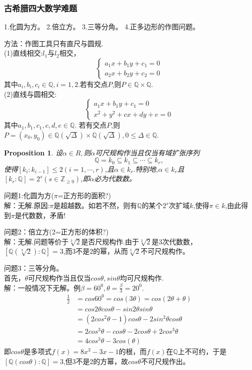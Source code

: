 \documentclass[UTF8]{article}
\newtheorem{prop}{Proposition}[section]
\begin{document}
\subsubsection{古希腊四大数学难题}

1.化圆为方。
2.倍立方。
3.三等分角。
4.正多边形的作图问题。


方法：作图工具只有直尺与圆规.\\
(1)直线相交:$l_{1}$与$l_{2}$相交，
\begin{displaymath}
\left\{ 
\begin{array}{ll}
a_{1}x+b_{1}y+c_{1}=0\\
a_{2}x+b_{2}y+c_{2}=0
\end{array}
\right.
\end{displaymath}
其中$a_{i},b_{i},c_{i}\in \mathbb{Q},i=1,2$.若有交点$P$,则$P\in \mathbb{Q}\times\mathbb{Q}.$\\
(2)直线与圆相交:
\begin{displaymath}
\left\{ 
\begin{array}{ll}
a_{1}x+b_{1}y+c_{1}=0\\
x^{2}+y^{2}+cx+dy+e=0
\end{array}
\right.
\end{displaymath}
其中$a_{1},b_{1},c_{1},c,d,e\in \mathbb{Q}.$
若有交点$P$,则$P=(x_{0},y_{0})\in \mathbb{Q}(\sqrt{\Delta})\times\mathbb{Q}(\sqrt{\Delta}) ,0\leq \Delta\in \mathbb{Q}$.\\
\begin{prop}
设$\alpha\in R,$则$\alpha$可尺规构作当且仅当有域扩张序列
$$\mathbb{Q}=k_{0}\subseteq k_{1}\subseteq \cdots\subseteq k_{r},
$$
使得$[k_{i}:k_{i-1}]\leq 2(i=1,\cdots,r)$,且$\alpha\in k_{r}.$特别地,$\alpha\in k_{r}$且$[k_{r}:\mathbb{Q}]=2^{s}(s\in \mathbb{Z}_{\geq 0})$,即$\alpha$必为代数数。
\end{prop}

问题1:化圆为方($\pi$=正方形的面积?)\\
解：无解.原因:$\pi$是超越数。如若不然，则有$\mathbb{Q}$的某个$2^{s}$次扩域$k$,使得$\pi\in k$,由此得到$\pi$是代数数，矛盾!


问题2：倍立方(2=正方形的体积?)\\
解：无解.问题等价于$\sqrt[3]{2}$是否尺规构作.由于$\sqrt[3]{2}$是3次代数数，$[\mathbb{Q}(\sqrt[3]{2}):\mathbb{Q}]=3$,而$3$不是$2$的幂，从而$\sqrt[3]{2}$不可尺规构作。


问题3：三等分角。\\
首先，$\theta$可尺规构作当且仅当$cos\theta,sin\theta$均可尺规构作.\\
解：一般情况下无解。例$\beta=60^{0},\theta=\frac{\beta}{3}=20^{0}.$
\[
\begin{split}
\frac{1}{2}&=cos60^{0}=cos(3\theta)=cos(2\theta+\theta)\\
&=cos2\theta cos\theta-sin2\theta sin \theta\\
&=(2cos^{2}\theta-1)cos\theta-2sin^{2}\theta cos\theta\\
&=2cos^{3}\theta-cos\theta-2cos\theta+2cos^{3}\theta\\
&=4cos^{3}\theta-3cos(\theta)
\end{split}
\]
即$cos\theta$是多项式$f(x)=8x^{3}-3x-1$的根，而$f(x)$在$\mathbb{Q}$上不可约，于是$[\mathbb{Q}(cos\theta):\mathbb{Q}]=3$,但3不是2的方幂，故$cos\theta$不可尺规作出。
\end{document}
